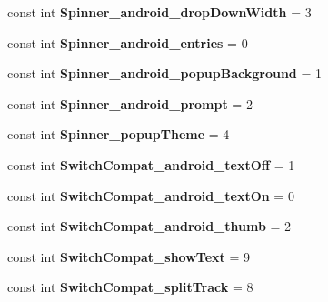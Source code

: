 \begin{DoxyCompactItemize}
const int {\bfseries Spinner\+\_\+android\+\_\+drop\+Down\+Width} = 3
\item 
\mbox{\label{classXaria_1_1Resource_1_1Styleable_a6717299e0673acf320d702492fff7c56}} 
const int {\bfseries Spinner\+\_\+android\+\_\+entries} = 0
\item 
\mbox{\label{classXaria_1_1Resource_1_1Styleable_a3b32b3cf8a8238afcc1423f2d8fe333e}} 
const int {\bfseries Spinner\+\_\+android\+\_\+popup\+Background} = 1
\item 
\mbox{\label{classXaria_1_1Resource_1_1Styleable_a663db5e20100efe636fab014c42f72ff}} 
const int {\bfseries Spinner\+\_\+android\+\_\+prompt} = 2
\item 
\mbox{\label{classXaria_1_1Resource_1_1Styleable_a6973d54806e1c9e415fdbf93ee478aad}} 
const int {\bfseries Spinner\+\_\+popup\+Theme} = 4
\item 
\mbox{\label{classXaria_1_1Resource_1_1Styleable_a51ebe445ced6f0d2c481fb4e08cc5e5c}} 
const int {\bfseries Switch\+Compat\+\_\+android\+\_\+text\+Off} = 1
\item 
\mbox{\label{classXaria_1_1Resource_1_1Styleable_adf27d1e7d3d0a359dfa7d795f989e2d9}} 
const int {\bfseries Switch\+Compat\+\_\+android\+\_\+text\+On} = 0
\item 
\mbox{\label{classXaria_1_1Resource_1_1Styleable_a719778da900d9193277d44fbb8fbc276}} 
const int {\bfseries Switch\+Compat\+\_\+android\+\_\+thumb} = 2
\item 
\mbox{\label{classXaria_1_1Resource_1_1Styleable_a388fcebecd0c2a311dd871c8089fd9d2}} 
const int {\bfseries Switch\+Compat\+\_\+show\+Text} = 9
\item 
\mbox{\label{classXaria_1_1Resource_1_1Styleable_a15937d7435e0c6c193878ece8b60ba4f}} 
const int {\bfseries Switch\+Compat\+\_\+split\+Track} = 8
\item 

\end{DoxyCompactItemize}
